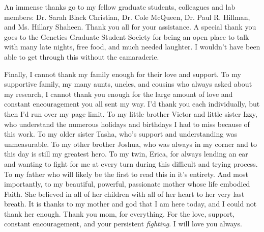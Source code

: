 An immense thanks go to my fellow graduate students, colleagues and lab members: Dr. Sarah Black Christian, Dr. Cole McQueen, Dr. Paul R. Hillman, and Ms. Hillary Shaheen. Thank you all for your assistance.
A special thank you goes to the Genetics Graduate Student Society for being an open place to talk with many late nights, free food, and much needed laughter. I wouldn't have been able to get through this without the camaraderie.

Finally, I cannot thank my family enough for their love and support.
To my supportive family, my many aunts, uncles, and cousins who always asked about my research, I cannot thank you enough for the large amount of love and constant encouragement you all sent my way. I'd thank you each individually, but then I'd run over my page limit.
To my little brother Victor and little sister Izzy, who understand the numerous holidays and birthdays I had to miss because of this work.
To my older sister Tasha, who's support and understanding was unmeasurable.
To my other brother Joshua, who was always in my corner and to this day is still my greatest hero.
To my twin, Erica, for always lending an ear and wanting to fight for me at every turn during this difficult and trying process.
To my father who will likely be the first to read this in it's entirety.
And most importantly, to my beautiful, powerful, passionate mother whose life embodied Faith. She believed in all of her children with all of her heart to her very last breath. It is thanks to my mother and god that I am here today, and I could not thank her enough. Thank you mom, for everything. For the love, support, constant encouragement, and your persistent \textit{fighting}. I will love you always.

\pagebreak{}
